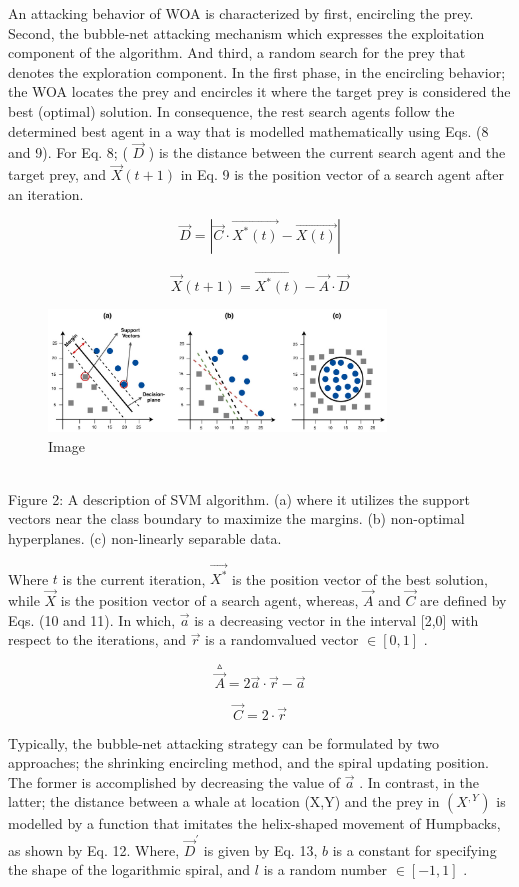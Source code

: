 \documentclass{article}
\begin{document}
An attacking behavior of WOA is characterized by first, encircling the prey. Second, the bubble-net attacking mechanism which expresses the exploitation component of the algorithm. And third, a random search for the prey that denotes the exploration component. In the first phase, in the encircling behavior; the WOA locates the prey and encircles it where the target prey is considered the best (optimal) solution. In consequence, the rest search agents follow the determined best agent in a way that is modelled mathematically using Eqs. (8 and 9). For Eq. 8; ( $\vec{D}$ ) is the distance between the current search agent and the target prey, and $\vec{X}(t+1)$ in Eq. 9 is the position vector of a search agent after an iteration.


$$ \vec{D}=|\vec{C}\cdot\vec{X^{*}(t)}-\vec{X(t)}| $$


$$ \vec{X}(t+1)=\vec{X^{*}(t)}-\vec{A}\cdot\vec{D} $$


\begin{figure}[htbp]
\centering
\includegraphics[width=0.8\textwidth]{images/ab40e7534200a28ad0392017099aeeaafed80ecd772ea2abf9eef4ad45a1a838.jpg}
\caption{Image}
\end{figure}

\\
Figure 2: A description of SVM algorithm. (a) where it utilizes the support vectors near the class boundary to maximize the margins. (b) non-optimal hyperplanes. (c) non-linearly separable data.


Where $t$ is the current iteration, $\vec{X^{*}}$ is the position vector of the best solution, while $\vec{X}$ is the position vector of a search agent, whereas, $\vec{A}$ and $\vec{C}$ are defined by Eqs. (10 and 11). In which, $\vec{a}$ is a decreasing vector in the interval [2,0] with respect to the iterations, and $\vec{r}$ is a randomvalued vector $\in\left[0,1\right]$ .


$$ \overset{\vartriangle}{\vec{A}}=2\vec{a}\cdot\vec{r}-\vec{a} $$


$$ {\vec{C}}=2\cdot{\vec{r}} $$


Typically, the bubble-net attacking strategy can be formulated by two approaches; the shrinking encircling method, and the spiral updating position. The former is accomplished by decreasing the value of $\vec{a}$ . In contrast, in the latter; the distance between a whale at location (X,Y) and the prey in $(X^{\textit{},Y^{}})$ is modelled by a function that imitates the helix-shaped movement of Humpbacks, as shown by Eq. 12. Where, $\vec{D}^{'}$ is given by Eq. 13, $b$ is a constant for specifying the shape of the logarithmic spiral, and $\textit{l}$ is a random number $\in[-1,1]$ .
\end{document}
